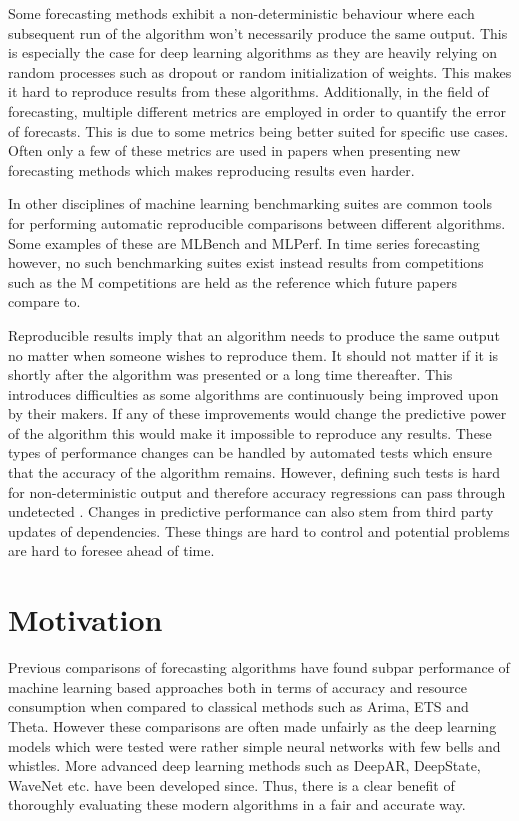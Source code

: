 Some forecasting methods exhibit a non-deterministic behaviour where each subsequent run of the algorithm won’t necessarily produce the same output. This is especially the case for deep learning algorithms as they are heavily relying on random processes such as dropout \cite{srivastava_dropout_2014} or random initialization of weights. This makes it hard to reproduce results from these algorithms. Additionally, in the field of forecasting, multiple different metrics are employed in order to quantify the error of forecasts. This is due to some metrics being better suited for specific use cases. Often only a few of these metrics are used in papers when presenting new forecasting methods which makes reproducing results even harder.

In other disciplines of machine learning benchmarking suites are common tools for performing automatic reproducible comparisons between different algorithms. Some examples of these are MLBench and MLPerf. In time series forecasting however, no such benchmarking suites exist instead results from competitions such as the M competitions  are held as the reference which future papers compare to. 

Reproducible results imply that an algorithm needs to produce the same output no matter when someone wishes to reproduce them. It should not matter if it is shortly after the algorithm was presented or a long time thereafter. This introduces difficulties as some algorithms are continuously being improved upon by their makers. If any of these improvements would change the predictive power of the algorithm this would make it impossible to reproduce any results. These types of performance changes can be handled by automated tests which ensure that the accuracy of the algorithm remains. However, defining such tests is hard for non-deterministic output and therefore accuracy regressions can pass through undetected \cite{gluonts_deepar_github_issue}. Changes in predictive performance can also stem from third party updates of dependencies. These things are hard to control and potential problems are hard to foresee ahead of time. 



\section{Motivation}
Previous comparisons of forecasting algorithms have found subpar performance of machine learning based approaches both in terms of accuracy and resource consumption when compared to classical methods such as Arima, ETS and Theta. However these comparisons are often made unfairly as the deep learning models which were tested were rather simple neural networks with few bells and whistles. More advanced deep learning methods such as DeepAR, DeepState, WaveNet etc. have been developed since. Thus, there is a clear benefit of thoroughly evaluating these modern algorithms in a fair and accurate way. 

